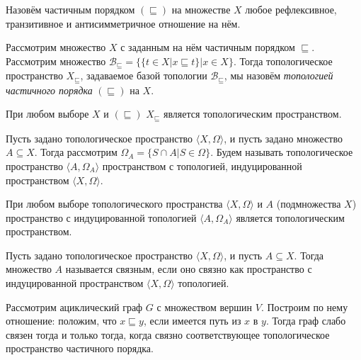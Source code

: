 \begin{definition} Назовём частичным порядком $(\sqsubseteq)$ на множестве $X$ любое 
рефлексивное, транзитивное и антисимметричное отношение на нём.
\end{definition}

\begin{definition} Рассмотрим множество $X$ с заданным на нём частичным порядком $\sqsubseteq$.
Рассмотрим множество $\mathcal{B}_\sqsubseteq = \{ \{ t \in X | x \sqsubseteq t \}| x \in X\}$.
Тогда топологическое пространство $X_\sqsubseteq$, задаваемое базой топологии $\mathcal{B}_\sqsubseteq$,
мы назовём \emph{топологией частичного порядка} $(\sqsubseteq)$ на $X$.
\end{definition}

\begin{theorem} При любом выборе $X$ и $(\sqsubseteq)$ $X_\sqsubseteq$ является топологическим пространством.
\end{theorem}

\begin{definition} Пусть задано топологическое пространство $\langle X, \Omega \rangle$, и пусть
задано множество $A \subseteq X$. Тогда рассмотрим $\Omega_A = \{ S \cap A | S \in \Omega \}$.
Будем называть топологическое пространство $\langle A, \Omega_A \rangle$ пространством с топологией,
индуцированной пространством $\langle X, \Omega \rangle$.
\end{definition}

\begin{theorem} При любом выборе топологического пространства $\langle X, \Omega \rangle$ и 
$A$ (подмножества $X$) пространство с индуцированной топологией 
$\langle A, \Omega_A \rangle$ является топологическим пространством.
\end{theorem}

\begin{theorem} Пусть задано топологическое пространство $\langle X, \Omega \rangle$, и пусть
$A \subseteq X$. Тогда множество $A$ называется связным, если оно связно как пространство
с индуцированной пространством $\langle X, \Omega \rangle$ топологией.
\end{theorem}

\begin{theorem} Рассмотрим ациклический граф $G$ с множеством вершин $V$. Построим по нему
отношение: положим, что $x \sqsubseteq y$, если имеется путь из $x$ в $y$.
Тогда граф слабо связен тогда и только тогда, когда связно соответствующее топологическое 
пространство частичного порядка. 
\end{theorem}
